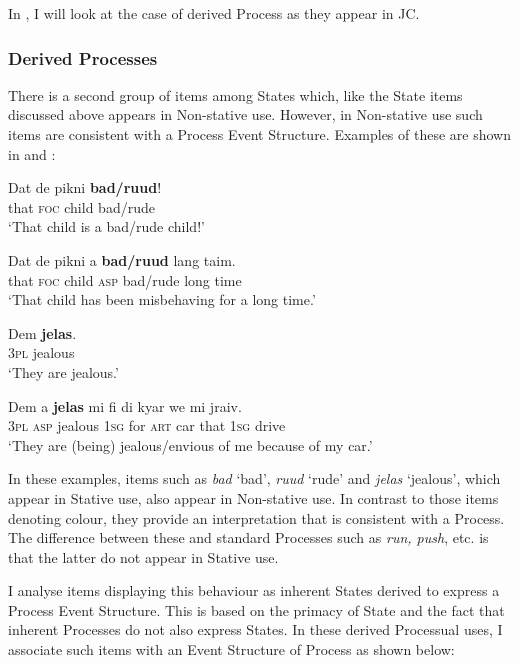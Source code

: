 In , I will look at the case of derived Process as they appear in JC.

\subsubsection{Derived Processes}\label{sec:5.2.3.2}

There is a second group of items among States which, like the State items discussed above appears in Non-stative use. However, in Non-stative use such items are consistent with a Process Event Structure. Examples of these are shown in  and : 

\ea%
 \label{ex:5:25}
\ea 
\gll Dat de pikni \textbf{bad/ruud}!\\
that \textsc{foc} child bad/rude\\
\glt `That child is a bad\slash rude child!'

\ex 
\gll Dat de pikni a \textbf{bad/ruud} lang taim.\\
 that \textsc{foc} child \textsc{asp} bad/rude long time\\
\glt `That child has been misbehaving for a long time.'
 \z
\z

\ea%
\label{ex:5:26}
\ea
\gll Dem \textbf{jelas}.\\
 \textsc{3pl} jealous \\
\glt `They are jealous.'

\ex 
\gll Dem a \textbf{jelas} mi fi di kyar we mi jraiv.\\ 
\textsc{3pl} \textsc{asp} jealous \textsc{1sg} for \textsc{art} car that \textsc{1sg} drive\\
\glt `They are (being) jealous\slash envious of me because of my car.'
\z
\z

In these examples, items such as \textit{bad} `bad', \textit{ruud} `rude' and \textit{jelas} `jealous', which appear in Stative use, also appear in Non-stative use. In contrast to those items denoting colour, they provide an interpretation that is consistent with a Process. The difference between these and standard Processes such as \textit{run, push}, etc. is that the latter do not appear in Stative use. 

I analyse items displaying this behaviour as inherent States derived to express a Process Event Structure. This is based on the primacy of State \citep{Grimshaw1990} and the fact that inherent Processes do not also express States. In these derived Processual uses, I associate such items with an Event Structure of Process as shown below:

